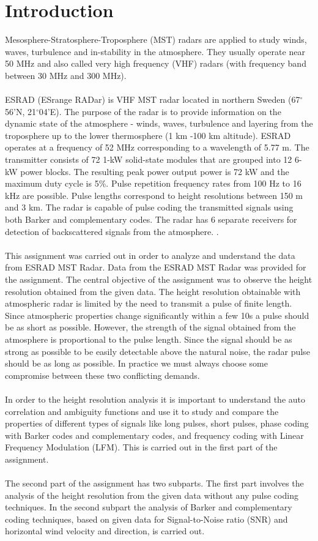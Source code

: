 \documentclass{article}
\begin{document}
\section{Introduction}
Mesosphere-Stratosphere-Troposphere (MST) radars are applied to study winds, waves, turbulence and in-stability in the atmosphere. They usually operate near 50 MHz and also called very high frequency (VHF) radars (with frequency band between 30 MHz and 300 MHz).\\
\\
ESRAD (ESrange RADar) is VHF MST radar located in northern Sweden (67$^{\circ}$56'N, 21$^{\circ}$04'E). The purpose of the radar is to provide information on the dynamic state of the atmosphere - winds, waves, turbulence and layering from the troposphere up to the lower thermosphere (1 km -100 km altitude). ESRAD operates at a frequency of 52 MHz corresponding to a wavelength of 5.77 m. The transmitter consists of 72 1-kW solid-state modules that are grouped into 12 6-kW power blocks. The resulting peak power output power is 72 kW and the maximum duty cycle is 5\%. Pulse repetition frequency rates from 100 Hz to 16 kHz are possible. Pulse lengths correspond to height resolutions between 150 m and 3 km. The radar is capable of pulse coding the transmitted signals using both Barker and complementary codes. The radar has 6 separate receivers for detection of backscattered signals from the atmosphere. \cite{Enmark:2012a2}.\\
\\
This assignment was carried out in order to analyze and understand the data from ESRAD MST Radar. Data from the ESRAD MST Radar was provided for the assignment. The central objective of the assignment was to observe the height resolution obtained from the given data. The height resolution obtainable with atmospheric radar is limited by the need to transmit a pulse of finite length. Since atmospheric properties change significantly within a few 10s a pulse should be as short as possible. However, the strength of the signal obtained from the atmosphere is proportional to the pulse length. Since the signal should be as strong as possible to be easily detectable above the natural noise, the radar pulse should be as long as possible. In practice we must always choose some compromise between these two conflicting demands.\\
\\
In order to the height resolution analysis it is important to understand the auto correlation and ambiguity functions and use it to study and compare the properties of different types of signals like long pulses, short pulses, phase coding with Barker codes and complementary codes, and frequency coding with Linear Frequency Modulation (LFM). This is carried out in the first part of the assignment.\\
\\
The second part of the assignment has two subparts. The first part involves the analysis of the height resolution from the given data without any pulse coding techniques. In the second subpart the analysis of Barker and complementary coding techniques, based on given data for Signal-to-Noise ratio (SNR) and horizontal wind velocity and direction, is carried out. 
 
\end{document}
